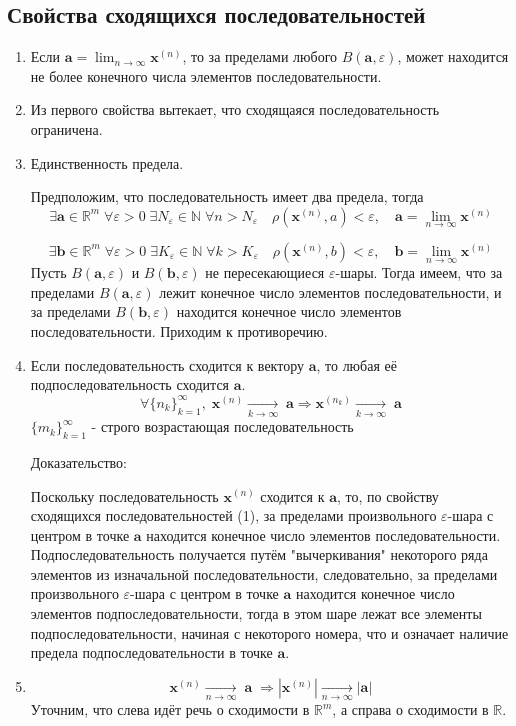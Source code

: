 \subsection{Свойства сходящихся последовательностей}
\begin{enumerate} 
  \item 
  Если $\textbf {a} = \lim_{n\to\infty}{\textbf{x}^{(n)}}$, то за пределами любого $B(\textbf {a}, \varepsilon)$, может находится не более конечного числа элементов последовательности.
  \item
  Из первого свойства вытекает, что сходящаяся последовательность ограничена.
  \item
  Единственность предела.
  
  Предположим, что последовательность имеет два предела, тогда 
$$
\exists \textbf {a} \in \mathbb {R}^m \; \forall \varepsilon > 0 \; \exists N_{\varepsilon} \in \mathbb {N} \; \forall n > N_{\varepsilon} \quad \rho(\textbf{x}^{(n)}, a) < {\varepsilon}, \quad \textbf {a} = \lim_{n\to\infty}{\textbf{x}^{(n)}}
$$

$$
\exists \textbf {b} \in \mathbb {R}^m \; \forall \varepsilon > 0 \; \exists K_{\varepsilon} \in \mathbb {N} \; \forall k > K_{\varepsilon} \quad \rho(\textbf{x}^{(n)}, b) < {\varepsilon}, \quad \textbf {b} = \lim_{n\to\infty}{\textbf{x}^{(n)}}
$$
Пусть $B(\textbf {a}, \varepsilon)$ и $B(\textbf {b}, \varepsilon)$ не пересекающиеся $\varepsilon$-шары. Тогда имеем, что за пределами $B(\textbf {a}, \varepsilon)$ лежит конечное число элементов последовательности, и за пределами $B(\textbf {b}, \varepsilon)$ находится конечное число элементов последовательности. Приходим к противоречию.
  \item
  Если последовательность сходится к вектору $\textbf {a}$, то любая её подпоследовательность сходится $\textbf {a}$.
  $$
  \forall \{n_k\}^{\infty}_{k=1}, \;\textbf {x}^{(n)} \underset{k \to \infty}{\longrightarrow} \; \textbf {a} \Rightarrow \textbf {x}^{(n_k)} \underset{k \to \infty}{\longrightarrow} \; \textbf {a}
  $$
  $\{m_k\}^{\infty}_{k=1}$ - строго возрастающая последовательность 
  
  Доказательство:
  
  Поскольку последовательность $\textbf {x}^{(n)}$ сходится к $\textbf {a}$, то, по свойству сходящихся последовательностей (1), за пределами произвольного $\varepsilon$-шара с центром в точке $\textbf {a}$ находится конечное число элементов последовательности. Подпоследовательность получается путём "вычеркивания" некоторого ряда элементов из изначальной последовательности, следовательно, за пределами произвольного $\varepsilon$-шара с центром в точке $\textbf {a}$ находится конечное число элементов подпоследовательности, тогда в этом шаре лежат все элементы подпоследовательности, начиная с некоторого номера, что и означает наличие предела подпоследовательности в точке $\textbf {a}$.
  \item
  $$
  \textbf {x}^{(n)} \underset{n \to \infty}{\longrightarrow} \; \textbf {a} \; \Rightarrow |\textbf {x}^{(n)}| \underset{n \to \infty}{\longrightarrow} |\textbf {a}|
  $$
  Уточним, что слева идёт речь о сходимости в $\mathbb {R}^m$, а справа о сходимости в $\mathbb {R}$.
  

\end{enumerate}
